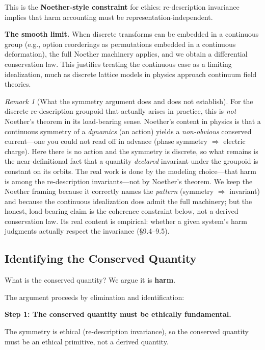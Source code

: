\documentclass[12pt,letterpaper]{article}
\theoremstyle{definition}
\theoremstyle{remark}
\newtheorem{remark}[theorem]{Remark}
\begin{document}
This is the \textbf{Noether-style constraint} for ethics: re-description invariance implies that harm accounting must be representation-independent.

\textbf{The smooth limit.} When discrete transforms can be embedded in a continuous group (e.g., option reorderings as permutations embedded in a continuous deformation), the full Noether machinery applies, and we obtain a differential conservation law. This justifies treating the continuous case as a limiting idealization, much as discrete lattice models in physics approach continuum field theories.

\begin{remark}[What the symmetry argument does and does not establish]
For the discrete re-description groupoid that actually arises in practice, this is \emph{not} Noether's theorem in its load-bearing sense. Noether's content in physics is that a continuous symmetry of a \emph{dynamics} (an action) yields a \emph{non-obvious} conserved current---one you could not read off in advance (phase symmetry $\Rightarrow$ electric charge). Here there is no action and the symmetry is discrete, so what remains is the near-definitional fact that a quantity \emph{declared} invariant under the groupoid is constant on its orbits. The real work is done by the modeling choice---that harm is among the re-description invariants---not by Noether's theorem. We keep the Noether framing because it correctly names the \emph{pattern} (symmetry $\Rightarrow$ invariant) and because the continuous idealization does admit the full machinery; but the honest, load-bearing claim is the coherence constraint below, not a derived conservation law. Its real content is empirical: whether a given system's harm judgments actually respect the invariance (\S9.4--9.5).
\end{remark}

\subsection{Identifying the Conserved Quantity}

What is the conserved quantity? We argue it is \textbf{harm}.

The argument proceeds by elimination and identification:

\textbf{Step 1: The conserved quantity must be ethically fundamental.}

The symmetry is ethical (re-description invariance), so the conserved quantity must be an ethical primitive, not a derived quantity.
\end{document}
